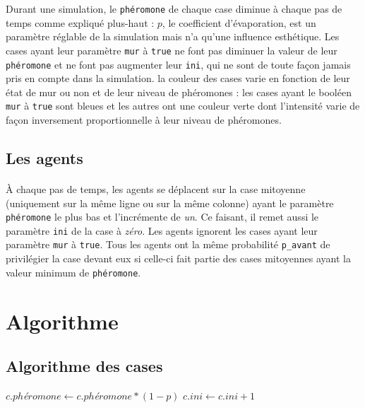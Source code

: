 \documentclass{article}
\begin{document}
        Durant une simulation, le \texttt{phéromone} de chaque case diminue à chaque pas de temps comme expliqué plus-haut : $p$, le coefficient
        d'évaporation, est un paramètre réglable de la simulation mais n'a qu'une influence esthétique. Les cases ayant leur paramètre \texttt{mur}
        à \texttt{true} ne font pas diminuer la valeur de leur \texttt{phéromone} et ne font pas augmenter leur \texttt{ini}, qui ne sont de toute façon jamais pris en compte dans la simulation.
        la couleur des cases varie en fonction de leur état de mur ou non et de leur niveau de phéromones : les cases
        ayant le booléen \texttt{mur} à \texttt{true} sont bleues et les autres ont une couleur verte dont l'intensité varie de façon inversement proportionnelle à leur
        niveau de phéromones.
    \subsection{Les agents}
        \paragraph{}À chaque pas de temps, les agents se déplacent sur la case mitoyenne (uniquement sur la même ligne ou sur la même colonne) 
        ayant le paramètre \texttt{phéromone} le plus bas et l'incrémente de \textit{un}. Ce faisant, il remet aussi le paramètre \texttt{ini} 
        de la case à \textit{zéro}. Les agents ignorent les cases ayant leur paramètre \texttt{mur} à \texttt{true}. Tous les agents ont la 
        même probabilité \texttt{p\_avant} de privilégier la case devant eux si celle-ci fait partie des cases mitoyennes ayant la valeur minimum
        de \texttt{phéromone}.
\section{Algorithme}
    \subsection{Algorithme des cases}
    \begin{algorithmic}
            \STATE $c.ph$\textit{é}$romone \gets c.ph$\textit{é}$romone  * (1-p)$
            \STATE $c.ini \gets c.ini+1$
        \ENDIF 
        \ENDFOR
        \end{algorithmic}
\end{document}

